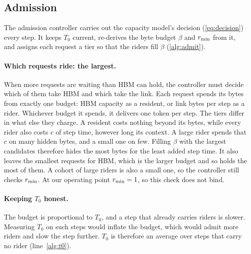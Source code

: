 
\subsection{Admission}\label{sec:admission}

The admission controller carries out the capacity model's decision
(\cref{eq:decision}) every step. It keeps $T_0$ current, re-derives the byte
budget $\beta$ and $r_{\min}$ from it, and assigns each request a tier so that the
riders fill $\beta$ (\cref{alg:admit}).

\paragraph{Which requests ride: the largest.} When more requests are waiting
than HBM can hold, the controller must decide which of them take HBM and which
take the link. Each request spends its bytes from exactly one budget: HBM
capacity as a resident, or link bytes per step as a rider. Whichever budget it
spends, it delivers one token per step. The tiers differ in what else they charge. A resident costs
nothing beyond its bytes, while every rider also costs $c$ of step time,
however long its context. A large rider spends that $c$ on many hidden bytes,
and a small one on few. Filling $\beta$ with the largest candidates therefore
hides the most bytes for the least added step time. It also leaves the smallest
requests for HBM, which is the larger budget and so holds the most of them. A
cohort of large riders is also a small one, so the controller still checks
$r_{\min}$. At our operating point $r_{\min} = 1$, so this check does not bind.

\paragraph{Keeping $T_0$ honest.} The budget is proportional to $T_0$, and a step
that already carries riders is slower. Measuring $T_0$ on such steps would
inflate the budget, which would admit more riders and slow the step further. $T_0$
is therefore an average over steps that carry no rider (line~\ref{alg:t0}).

